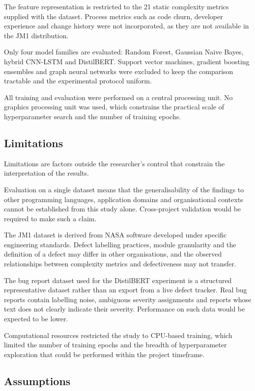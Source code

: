 \documentclass[12pt,a4paper,oneside]{report}
\begin{document}
The feature representation is restricted to the 21 static complexity metrics supplied with the dataset. Process metrics such as code churn, developer experience and change history were not incorporated, as they are not available in the JM1 distribution.

Only four model families are evaluated: Random Forest, Gaussian Naive Bayes, hybrid CNN-LSTM and DistilBERT. Support vector machines, gradient boosting ensembles and graph neural networks were excluded to keep the comparison tractable and the experimental protocol uniform.

All training and evaluation were performed on a central processing unit. No graphics processing unit was used, which constrains the practical scale of hyperparameter search and the number of training epochs.

\subsection{Limitations}

Limitations are factors outside the researcher's control that constrain the interpretation of the results.

Evaluation on a single dataset means that the generalisability of the findings to other programming languages, application domains and organisational contexts cannot be established from this study alone. Cross-project validation would be required to make such a claim.

The JM1 dataset is derived from NASA software developed under specific engineering standards. Defect labelling practices, module granularity and the definition of a defect may differ in other organisations, and the observed relationships between complexity metrics and defectiveness may not transfer.

The bug report dataset used for the DistilBERT experiment is a structured representative dataset rather than an export from a live defect tracker. Real bug reports contain labelling noise, ambiguous severity assignments and reports whose text does not clearly indicate their severity. Performance on such data would be expected to be lower.

Computational resources restricted the study to CPU-based training, which limited the number of training epochs and the breadth of hyperparameter exploration that could be performed within the project timeframe.

\subsection{Assumptions}
\end{document}
